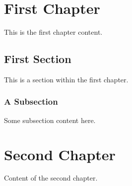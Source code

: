

\chapter{First Chapter}

This is the first chapter content.

\section{First Section}

This is a section within the first chapter.

\subsection{A Subsection}

Some subsection content here.

\chapter{Second Chapter}

Content of the second chapter.


